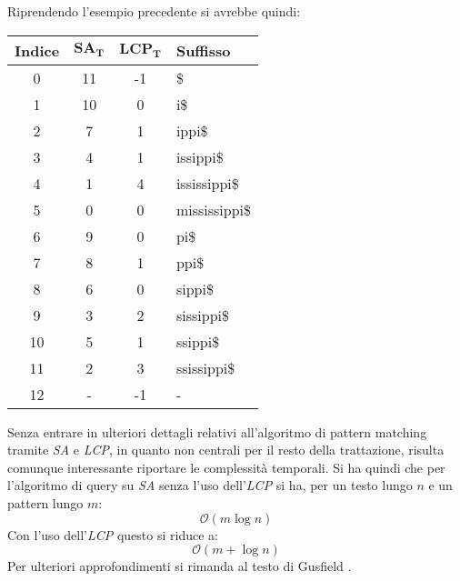 \begin{esempio}
  Riprendendo l'esempio precedente si avrebbe quindi:
  \begin{table}[H]
    \centering
    \footnotesize
    \begin{tabular}{c|c|c|l} 
      \textbf{Indice} & $\mathbf{SA_T}$ & $\mathbf{LCP_T}$ & \textbf{Suffisso}\\ 
      \hline
      0 & 11 & -1 & \$\\
      1 & 10 & 0 & i\$\\
      2 & 7 & 1 & ippi\$\\
      3 & 4 & 1 & issippi\$\\
      4 & 1 & 4 & ississippi\$\\
      5 & 0 & 0 & mississippi\$\\
      6 & 9 & 0 & pi\$\\
      7 & 8 & 1 & ppi\$\\
      8 & 6 & 0 & sippi\$\\
      9 & 3 & 2 & sissippi\$\\
      10 & 5 & 1 & ssippi\$\\
      11 & 2 & 3 & ssissippi\$\\
      12 & - & -1 & -
    \end{tabular}
  \end{table}
\end{esempio}
Senza entrare in ulteriori dettagli relativi all'algoritmo di pattern matching
tramite \textit{SA} e \textit{LCP}, in quanto non centrali per il resto della
trattazione, risulta comunque interessante riportare le complessità
temporali. Si ha quindi che per l'algoritmo di query su \textit{SA} senza l'uso
dell'\textit{LCP} si ha, per un testo lungo $n$ e un pattern lungo $m$:
\[\mathcal{O}(m\log n)\]
Con l'uso dell'\textit{LCP} questo si riduce a:
\[\mathcal{O}(m+\log n)\]
Per ulteriori approfondimenti si rimanda al testo di Gusfield
\cite{gusfield_1997}. 